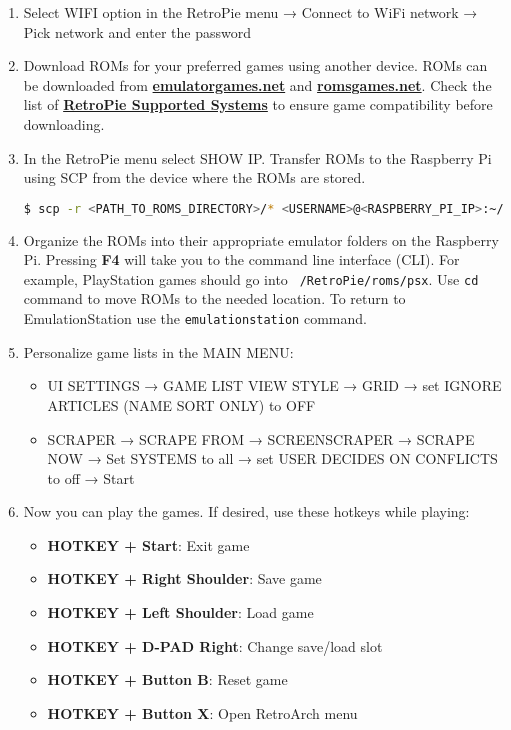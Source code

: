 \begin{enumerate}
\item Select WIFI option in the RetroPie menu → Connect to WiFi network → Pick network and enter the password

\item Download ROMs for your preferred games using another device. ROMs can be downloaded from \href{https://www.emulatorgames.net}{\textbf{\color{blue}emulatorgames.net}} and \href{https://www.romsgames.net}{\textbf{\color{blue}romsgames.net}}. Check the list of \href{https://retropie.org.uk/docs/Supported-Systems/}{\textbf{\color{blue}RetroPie Supported Systems}} to ensure game compatibility before downloading.

\item In the RetroPie menu select SHOW IP. Transfer ROMs to the Raspberry Pi using SCP from the device where the ROMs are stored.
\begin{lstlisting}[language=bash, breaklines=true, breakatwhitespace=true, columns=fullflexible]
$ scp -r <PATH_TO_ROMS_DIRECTORY>/* <USERNAME>@<RASPBERRY_PI_IP>:~/RetroPie/roms/
\end{lstlisting} 

\item Organize the ROMs into their appropriate emulator folders on the Raspberry Pi.
Pressing \textbf{F4} will take you to the command line interface (CLI). For example, PlayStation games should go into \texttt{~/RetroPie/roms/psx}. Use \texttt{cd} command to move ROMs to the needed location. To return to EmulationStation use the \texttt{emulationstation} command.

\item Personalize game lists in the MAIN MENU:
\begin{itemize}
\item UI SETTINGS → GAME LIST VIEW STYLE → GRID → set IGNORE ARTICLES (NAME SORT ONLY) to OFF
\item SCRAPER → SCRAPE FROM → SCREENSCRAPER → SCRAPE NOW → Set SYSTEMS to all → set USER DECIDES ON CONFLICTS to off → Start
\end{itemize}

\item Now you can play the games. If desired, use these hotkeys while playing:
\begin{itemize}
\item \textbf{HOTKEY + Start}: Exit game
\item \textbf{HOTKEY + Right Shoulder}: Save game
\item \textbf{HOTKEY + Left Shoulder}: Load game
\item \textbf{HOTKEY + D-PAD Right}: Change save/load slot
\item \textbf{HOTKEY + Button B}: Reset game
\item \textbf{HOTKEY + Button X}: Open RetroArch menu
\end{itemize}

\end{enumerate}

